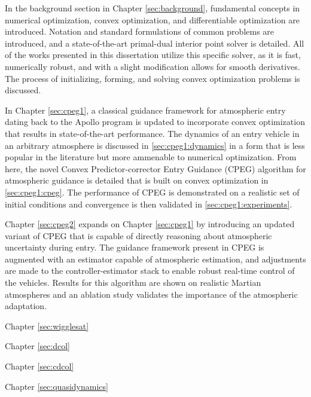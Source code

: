 In the background section in Chapter \ref{sec:background}, fundamental concepts in numerical optimization, convex optimization, and differentiable optimization are introduced. Notation and standard formulations of common problems are introduced, and a state-of-the-art primal-dual interior point solver is detailed. All of the works presented in this dissertation utilize this specific solver, as it is fast, numerically robust, and with a slight modification allows for smooth derivatives. The process of initializing, forming, and solving convex optimization problems is discussed. 

In Chapter \ref{sec:cpeg1}, a classical guidance framework for atmospheric entry dating back to the Apollo program is updated to incorporate convex optimization that results in state-of-the-art performance. The dynamics of an entry vehicle in an arbitrary atmosphere is discussed in \ref{sec:cpeg1:dynamics} in a form that is less popular in the literature but more ammenable to numerical optimization. From here, the novel Convex Predictor-corrector Entry Guidance (CPEG) algorithm for atmospheric guidance is detailed that is built on convex optimization in \ref{sec:cpeg1:cpeg}. The performance of CPEG is demonstrated on a realistic set of initial conditions and convergence is then validated in \ref{sec:cpeg1:experiments}. 

Chapter \ref{sec:cpeg2} expands on Chapter \ref{sec:cpeg1} by introducing an updated variant of CPEG that is capable of directly reasoning about atmospheric uncertainty during entry. The guidance framework present in CPEG is augmented with an estimator capable of atmospheric estimation, and adjustments are made to the controller-estimator stack to enable robust real-time control of the vehicles. Results for this algorithm are shown on realistic Martian atmospheres and an ablation study validates the importance of the atmospheric adaptation. 

Chapter \ref{sec:wigglesat}

Chapter \ref{sec:dcol}

Chapter \ref{sec:cdcol}

Chapter \ref{sec:quasidynamics}



